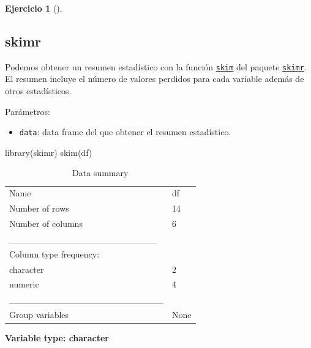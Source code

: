 \documentclass[
  a4paper,
]{scrreport}
\newenvironment{Shaded}{\begin{snugshade}}{\end{snugshade}}
\newcommand{\FunctionTok}[1]{\textcolor[rgb]{0.28,0.35,0.67}{#1}}
\newcommand{\NormalTok}[1]{\textcolor[rgb]{0.00,0.23,0.31}{#1}}
\providecommand{\tightlist}{%
  \setlength{\itemsep}{0pt}\setlength{\parskip}{0pt}}\usepackage{longtable,booktabs,array}
\theoremstyle{definition}
\newtheorem{exercise}{Ejercicio}[chapter]
\theoremstyle{remark}
\begin{document}
\begin{exercise}[]
\begin{enumerate}
\begin{tcolorbox}
  \section{skimr}

  Podemos obtener un resumen estadístico con la función
  \href{https://www.rdocumentation.org/packages/skimr/versions/2.2.1/topics/skim}{\texttt{skim}}
  del paquete
  \href{https://www.rdocumentation.org/packages/skimr}{\texttt{skimr}}.
  El resumen incluye el número de valores perdidos para cada variable
  además de otros estadísticos.

  Parámetros:

  \begin{itemize}
  \tightlist
  \item
    \texttt{data}: data frame del que obtener el resumen estadístico.
  \end{itemize}

\begin{Shaded}
\begin{Highlighting}[]
\FunctionTok{library}\NormalTok{(skimr)}
\FunctionTok{skim}\NormalTok{(df)}
\end{Highlighting}
\end{Shaded}

  \begin{longtable}[]{@{}ll@{}}
  \caption{Data summary}\tabularnewline
  \toprule\noalign{}
  \endfirsthead
  \endhead
  \bottomrule\noalign{}
  \endlastfoot
  Name & df \\
  Number of rows & 14 \\
  Number of columns & 6 \\
  \_\_\_\_\_\_\_\_\_\_\_\_\_\_\_\_\_\_\_\_\_\_\_ & \\
  Column type frequency: & \\
  character & 2 \\
  numeric & 4 \\
  \_\_\_\_\_\_\_\_\_\_\_\_\_\_\_\_\_\_\_\_\_\_\_\_ & \\
  Group variables & None \\
  \end{longtable}

  \textbf{Variable type: character}


\end{tcolorbox}
\end{enumerate}
\end{exercise}
\end{document}
